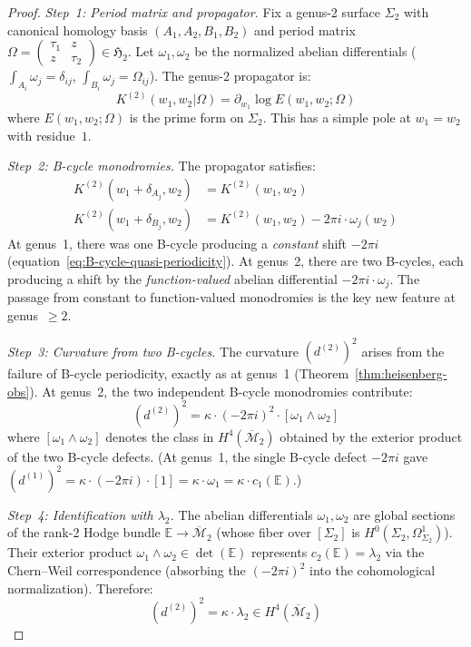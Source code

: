 \begin{proof}
\emph{Step~1: Period matrix and propagator.}
Fix a genus-2 surface $\Sigma_2$ with canonical homology basis $(A_1, A_2, B_1, B_2)$ and period matrix $\Omega = \begin{pmatrix} \tau_1 & z \\ z & \tau_2 \end{pmatrix} \in \mathfrak{H}_2$.  Let $\omega_1, \omega_2$ be the normalized abelian differentials ($\int_{A_i} \omega_j = \delta_{ij}$, $\int_{B_i} \omega_j = \Omega_{ij}$).  The genus-2 propagator is:
\begin{equation}\label{eq:genus2-propagator}
K^{(2)}(w_1, w_2 | \Omega) = \partial_{w_1} \log E(w_1, w_2; \Omega)
\end{equation}
where $E(w_1, w_2; \Omega)$ is the prime form on $\Sigma_2$.  This has a simple pole at $w_1 = w_2$ with residue~$1$.

\emph{Step~2: B-cycle monodromies.}
The propagator satisfies:
\begin{align}
K^{(2)}(w_1 + \delta_{A_j}, w_2) &= K^{(2)}(w_1, w_2) \label{eq:genus2-A-periodicity} \\
K^{(2)}(w_1 + \delta_{B_j}, w_2) &= K^{(2)}(w_1, w_2) - 2\pi i \cdot \omega_j(w_2) \label{eq:genus2-B-quasi}
\end{align}
At genus~1, there was one B-cycle producing a \emph{constant} shift $-2\pi i$ (equation~\eqref{eq:B-cycle-quasi-periodicity}).  At genus~2, there are two B-cycles, each producing a shift by the \emph{function-valued} abelian differential $-2\pi i \cdot \omega_j$.  The passage from constant to function-valued monodromies is the key new feature at genus~$\geq 2$.

\emph{Step~3: Curvature from two B-cycles.}
The curvature $(d^{(2)})^2$ arises from the failure of B-cycle periodicity, exactly as at genus~1 (Theorem~\ref{thm:heisenberg-obs}).  At genus~2, the two independent B-cycle monodromies contribute:
\begin{equation}\label{eq:genus2-curvature-product}
(d^{(2)})^2 = \kappa \cdot (-2\pi i)^2 \cdot [\omega_1 \wedge \omega_2]
\end{equation}
where $[\omega_1 \wedge \omega_2]$ denotes the class in $H^4(\overline{\mathcal{M}}_2)$ obtained by the exterior product of the two B-cycle defects.  (At genus~1, the single B-cycle defect $-2\pi i$ gave $(d^{(1)})^2 = \kappa \cdot (-2\pi i) \cdot [1] = \kappa \cdot \omega_1 = \kappa \cdot c_1(\mathbb{E})$.)

\emph{Step~4: Identification with $\lambda_2$.}
The abelian differentials $\omega_1, \omega_2$ are global sections of the rank-2 Hodge bundle $\mathbb{E} \to \overline{\mathcal{M}}_2$ (whose fiber over $[\Sigma_2]$ is $H^0(\Sigma_2, \Omega^1_{\Sigma_2})$).  Their exterior product $\omega_1 \wedge \omega_2 \in \det(\mathbb{E})$ represents $c_2(\mathbb{E}) = \lambda_2$ via the Chern--Weil correspondence (absorbing the $(-2\pi i)^2$ into the cohomological normalization).  Therefore:
\begin{equation}
(d^{(2)})^2 = \kappa \cdot \lambda_2 \in H^4(\overline{\mathcal{M}}_2)
\end{equation}
\end{proof}

